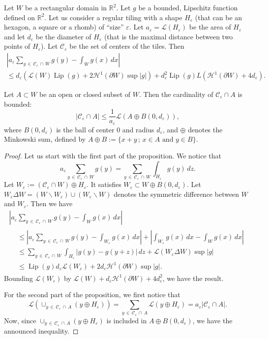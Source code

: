 \documentclass[AHL,Unicode,longabstracts,published]{cedram}
\newcommand{\R}{\mathbb{R}}
\newcommand{\eps}{\varepsilon}
\DeclareMathOperator{\Lip}{Lip}
\newcommand{\calH}{\mathcal{H}}
\newcommand{\calL}{\mathcal{L}}
\newcommand{\calC}{\mathcal{C}}
\begin{document}
\begin{prop}\label{approx:prop}
Let $W$ be a rectangular domain in $\R^2$. Let $g$ be a bounded, Lipschitz function defined on $\R^2$. Let us consider a regular tiling with a shape $H_\eps$ (that can be an hexagon, a square or a rhomb) of ``size'' $\eps$. Let $a_\eps=\calL(H_\eps)$ be the area of $H_\eps$ and let $d_\eps$ be the diameter of $H_\eps$ (that is the maximal distance between two points of $H_\eps$). Let $\calC_\eps$ be the set of centers of the tiles. Then
\begin{multline*}
\left| a_\eps \sum_{y\,\in\,\calC_\eps \,\cap\,W } g(y) - \int_W g(x) \, dx
\right|
\\
\leq d_\eps \left(\calL(W) \Lip(g) + 2 \calH^1(\partial W)
\sup |g|\right) + d_\eps^2 \Lip(g) L\left(\calH^1(\partial W) + 4 d_\eps\right).
\end{multline*}

Let $A\subset W$ be an open or closed subset of $W$. Then the cardinality of $\calC_\eps \cap A$ is bounded:
\[
\left| \calC_\eps \cap A \right| \leq \frac{1}{a_\eps} \calL \left(A
\oplus B(0,d_\eps)\right),
\]
where $B(0,d_\eps)$ is the ball of center $0$ and radius $d_\eps$, and $\oplus$ denotes the Minkowski sum, defined by $A\oplus B := \{x+y \, ; \, x\in A \text{ and } y\in B\}$.
\end{prop}

\begin{proof}
Let us start with the first part of the proposition. We notice that
\[
a_\eps \sum_{y\,\in\,\calC_\eps\,\cap\,W } g(y) = \sum_{y\,\in\,\calC_\eps\,
\cap\,W } \int_{H_\eps} g(y) \, dz.
\]
Let $W_\eps :=(\calC_\eps \cap W) \oplus H_\eps$. It satisfies $W_\eps \subset W\oplus B(0,d_\eps)$. Let $W_\eps\Delta W =(W\backslash W_\eps)\cup (W_\eps\backslash W)$ denotes the symmetric difference between $W$ and $W_\eps$. 
Then we have
\begin{multline*}
\left| a_\eps \sum_{y\,\in\,\calC_\eps \,\cap\,W } g(y) - \int_W g(x) \, dx
\right|\\
\begin{aligned}
& \leq \left| a_\eps \sum_{y\,\in\,\calC_\eps\,\cap\,W } g(y) - \int_{W_\eps} g(x) \, dx
\right| + \left| \int_{W_\eps} g(x) \, dx - \int_W g(x) \, dx
\right| \\
& \leq \sum_{y\,\in\,\calC_\eps\,\cap\,W} \int_{H_\eps} |g(y) - g(y+z)| \, dz + \calL \left(W_\eps\Delta W\right) \sup |g| \\
& \leq \Lip(g) d_\eps \calL (W_\eps) + 2 d_\eps
\calH^1(\partial W) \sup |g|.
\end{aligned}
\end{multline*}
Bounding $\calL(W_\eps)$ by $\calL(W) + d_\eps
\calH^1(\partial W) + 4 d_\eps^2$, we have the result.


For the second part of the proposition, we first notice that
\[
\calL \left(\cup_{y\,\in\,\calC_\eps\,\cap\,A} (y \oplus H_\eps)\right) =
\sum_{y\,\in\,\calC_\eps\,\cap\,A} \calL(y \oplus H_\eps) = a_\eps \left|
\calC_\eps \cap A \right|.
\]
Now, since $\cup_{y\,\in\,\calC_\eps\,\cap\,A} (y \oplus H_\eps)$ is included in $A \oplus B(0,d_\eps)$, we have the announced inequality.
\end{proof}
\end{document}

